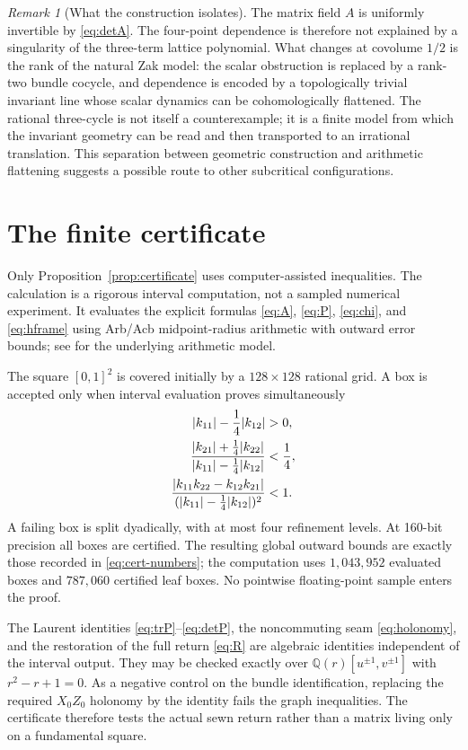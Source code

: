 \documentclass[11pt]{amsart}
\theoremstyle{remark}
\newtheorem{remark}[theorem]{Remark}
\newcommand{\Q}{\mathbb Q}
\begin{document}
\begin{remark}[What the construction isolates]\label{rem:meaning}
The matrix field $A$ is uniformly invertible by \eqref{eq:detA}.  The
four-point dependence is therefore not explained by a singularity of the
three-term lattice polynomial.  What changes at covolume $1/2$ is the rank of
the natural Zak model: the scalar obstruction is replaced by a rank-two
bundle cocycle, and dependence is encoded by a topologically trivial invariant
line whose scalar dynamics can be cohomologically flattened.  The rational
three-cycle is not itself a counterexample; it is a finite model from which
the invariant geometry can be read and then transported to an irrational
translation.  This separation between geometric construction and arithmetic flattening
suggests a possible route to other subcritical configurations.
\end{remark}

\appendix
\section{The finite certificate}\label{app:certificate}

Only Proposition~\ref{prop:certificate} uses computer-assisted inequalities.
The calculation is a rigorous interval computation, not a sampled numerical
experiment.  It evaluates the explicit formulas
\eqref{eq:A}, \eqref{eq:P}, \eqref{eq:chi}, and \eqref{eq:hframe} using
Arb/Acb midpoint-radius arithmetic with outward error bounds; see
\cite{Johansson17} for the underlying arithmetic model.

The square $[0,1]^2$ is covered initially by a $128\times128$ rational grid.
A box is accepted only when interval evaluation proves simultaneously
\begin{align}\label{eq:app-cert}
 |k_{11}|-\frac14|k_{12}|&>0,\notag\\
 \frac{|k_{21}|+\frac14|k_{22}|}
 {|k_{11}|-\frac14|k_{12}|}&<\frac14,\\
 \frac{|k_{11}k_{22}-k_{12}k_{21}|}
 {( |k_{11}|-\frac14|k_{12}|)^2}&<1.\notag
\end{align}
A failing box is split dyadically, with at most four refinement levels.  At
160-bit precision all boxes are certified.  The resulting global outward
bounds are exactly those recorded in \eqref{eq:cert-numbers}; the computation
uses $1{,}043{,}952$ evaluated boxes and $787{,}060$ certified leaf boxes.
No pointwise floating-point sample enters the proof.

The Laurent identities \eqref{eq:trP}--\eqref{eq:detP}, the noncommuting seam
\eqref{eq:holonomy}, and the restoration of the full return
\eqref{eq:R} are algebraic identities independent of the interval output.
They may be checked exactly over $\Q(r)[u^{\pm1},v^{\pm1}]$ with
$r^2-r+1=0$.  As a negative control on the bundle identification, replacing
the required $X_0Z_0$ holonomy by the identity fails the graph inequalities.
The certificate therefore tests the actual sewn return rather than a matrix
living only on a fundamental square.
\end{document}
